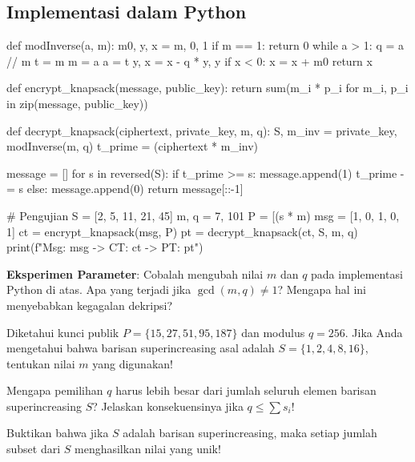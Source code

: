 \subsection{Implementasi dalam Python}

\begin{pycode}
def modInverse(a, m):
    m0, y, x = m, 0, 1
    if m == 1: return 0
    while a > 1:
        q = a // m
        t = m
        m = a %
        a = t
        y, x = x - q * y, y
    if x < 0: x = x + m0
    return x

def encrypt_knapsack(message, public_key):
    return sum(m_i * p_i for m_i, p_i in zip(message, public_key))

def decrypt_knapsack(ciphertext, private_key, m, q):
    S, m_inv = private_key, modInverse(m, q)
    t_prime = (ciphertext * m_inv) %

    message = []
    for s in reversed(S):
        if t_prime >= s:
            message.append(1)
            t_prime -= s
        else:
            message.append(0)
    return message[::-1]

# Pengujian
S = [2, 5, 11, 21, 45]
m, q = 7, 101
P = [(s * m) %
msg = [1, 0, 1, 0, 1]
ct = encrypt_knapsack(msg, P)
pt = decrypt_knapsack(ct, S, m, q)
print(f"Msg: {msg} -> CT: {ct} -> PT: {pt}")
\end{pycode}

\begin{aktivitas}
  \item \textbf{Eksperimen Parameter}: Cobalah mengubah nilai $m$ dan $q$ pada implementasi Python di atas. Apa yang terjadi jika $\gcd(m, q) \neq 1$? Mengapa hal ini menyebabkan kegagalan dekripsi?
\end{aktivitas}

\begin{latihan}
  \item Diketahui kunci publik $P = \{15, 27, 51, 95, 187\}$ dan modulus $q=256$. Jika Anda mengetahui bahwa barisan superincreasing asal adalah $S = \{1, 2, 4, 8, 16\}$, tentukan nilai $m$ yang digunakan!
  \item Mengapa pemilihan $q$ harus lebih besar dari jumlah seluruh elemen barisan superincreasing $S$? Jelaskan konsekuensinya jika $q \le \sum s_i$!
  \item Buktikan bahwa jika $S$ adalah barisan superincreasing, maka setiap jumlah subset dari $S$ menghasilkan nilai yang unik!
\end{latihan}
